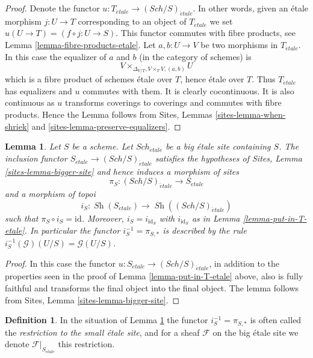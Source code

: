 \documentclass{stacks-project}
\theoremstyle{plain}
\newtheorem{lemma}[subsection]{Lemma}
\theoremstyle{definition}
\newtheorem{definition}[subsection]{Definition}
\theoremstyle{remark}
\numberwithin{equation}{subsection}
\def\Sch{\mathit{Sch}}
\def\Sh{\mathop{\mathit{Sh}}\nolimits}
\def\etale{{\acute{e}tale}}
\begin{document}
\begin{proof}
Denote the functor $u : T_\etale \to (\Sch/S)_\etale$.
In other words, given an \'etale morphism $j : U \to T$ corresponding
to an object of $T_\etale$ we set $u(U \to T) = (f \circ j : U \to S)$.
This functor commutes with fibre products, see
Lemma \ref{lemma-fibre-products-etale}.
Let $a, b : U \to V$ be two morphisms in $T_\etale$.
In this case the equalizer of $a$ and $b$ (in the category of schemes) is
$$
V \times_{\Delta_{V/T}, V \times_T V, (a, b)} U
$$
which is a fibre product of schemes \'etale over $T$, hence \'etale
over $T$. Thus $T_\etale$ has equalizers and $u$ commutes with them.
It is clearly cocontinuous.
It is also continuous as $u$ transforms coverings to coverings and
commutes with fibre products. Hence the Lemma follows from
Sites, Lemmas \ref{sites-lemma-when-shriek}
and \ref{sites-lemma-preserve-equalizers}.
\end{proof}

\begin{lemma}
\label{lemma-at-the-bottom-etale}
Let $S$ be a scheme. Let $\Sch_\etale$ be a big \'etale
site containing $S$.
The inclusion functor $S_\etale \to (\Sch/S)_\etale$
satisfies the hypotheses of Sites, Lemma \ref{sites-lemma-bigger-site}
and hence induces a morphism of sites
$$
\pi_S : (\Sch/S)_\etale \longrightarrow S_\etale
$$
and a morphism of topoi
$$
i_S : \Sh(S_\etale) \longrightarrow \Sh((\Sch/S)_\etale)
$$
such that $\pi_S \circ i_S = \text{id}$. Moreover, $i_S = i_{\text{id}_S}$
with $i_{\text{id}_S}$ as in Lemma \ref{lemma-put-in-T-etale}.
In particular the functor $i_S^{-1} = \pi_{S, *}$ is described by the rule
$i_S^{-1}(\mathcal{G})(U/S) = \mathcal{G}(U/S)$.
\end{lemma}

\begin{proof}
In this case the functor
$u : S_\etale \to (\Sch/S)_\etale$,
in addition to the properties seen in the proof of
Lemma \ref{lemma-put-in-T-etale} above, also is fully faithful
and transforms the final object into the final object.
The lemma follows from Sites, Lemma \ref{sites-lemma-bigger-site}.
\end{proof}

\begin{definition}
\label{definition-restriction-small-etale}
In the situation of
Lemma \ref{lemma-at-the-bottom-etale}
the functor $i_S^{-1} = \pi_{S, *}$ is often
called the {\it restriction to the small \'etale site}, and for a sheaf
$\mathcal{F}$ on the big \'etale site we denote
$\mathcal{F}|_{S_\etale}$ this restriction.
\end{definition}
\end{document}
